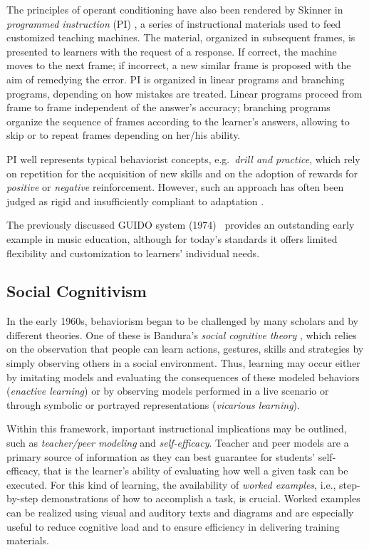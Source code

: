 \documentclass[journal]{IEEEtran}
\begin{document}
The principles of operant conditioning have also been rendered by Skinner in \textit{programmed instruction} (PI) \cite{skinner1958teaching}, a series of instructional materials used to feed customized teaching machines. The material, organized in subsequent frames, is presented to learners with the request of a response. If correct, the machine moves to the next frame; if incorrect, a new similar frame is proposed with the aim of remedying the error. PI is organized in linear programs and branching programs, depending on how mistakes are treated. Linear programs proceed from frame to frame independent of the answer's accuracy; branching programs organize the sequence of frames according to the learner's answers, allowing to skip or to repeat frames depending on her/his ability. 

PI well represents typical behaviorist concepts, e.g.\ \textit{drill and practice}, which rely on repetition for the acquisition of new skills and on the adoption of rewards for \textit{positive} or \textit{negative} reinforcement. However, such an approach has often been judged as rigid and insufficiently compliant to adaptation \cite{mcdonald2005learning}. 

The previously discussed GUIDO system (1974)~\cite{hofstetter1975guido,eddins1981brief} provides an outstanding early example in music education, although for today's standards it offers limited flexibility and customization to learners' individual needs.


\subsection{Social Cognitivism}
In the early 1960s, behaviorism began to be challenged by many scholars and by different theories. One of these is Bandura's \textit{social cognitive theory} \cite{bandura1986social}, which relies on the observation that people can learn actions, gestures, skills and strategies by simply observing others in a social environment. Thus, learning may occur either by imitating models and evaluating the consequences of these modeled behaviors (\textit{enactive learning}) or by observing models performed in a live scenario or through symbolic or portrayed representations (\textit{vicarious learning}). 

Within this framework, important instructional implications may be outlined, such as \textit{teacher/peer modeling} and \textit{self-efficacy}. Teacher and peer models are a primary source of information as they can best guarantee for students' self-efficacy, that is the learner's ability of evaluating how well a given task can be executed. For this kind of learning, the availability of \textit{worked examples}, i.e., step-by-step demonstrations of how to accomplish a task, is crucial. Worked examples can be realized using visual and auditory texts and diagrams \cite{kalyuga2000incorporating} and are especially useful to reduce cognitive load and to ensure efficiency in delivering training materials. 
\end{document}

